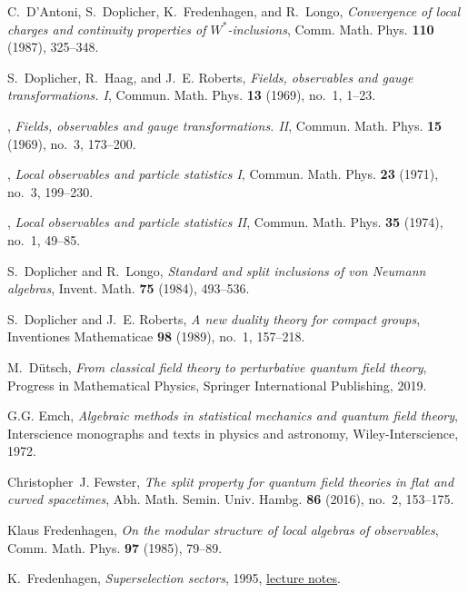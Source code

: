 \documentclass[12pt]{article}
\newcommand{\1}{\mathds{1}}                         %
\begin{document}
{\begin{thebibliography}{BDFY15}
	C.~D'Antoni, S.~Doplicher, K.~Fredenhagen, and R.~Longo, \emph{Convergence of
		local charges and continuity properties of {$W^*$}-inclusions}, Comm. Math.
	Phys. \textbf{110} (1987), 325--348. 
	
	S.~Doplicher, R.~Haag, and J.~E. Roberts, \emph{Fields, observables and gauge
		transformations. {I}}, Commun. Math. Phys. \textbf{13} (1969), no.~1, 1--23.
	
	\bysame, \emph{Fields, observables and gauge transformations. {II}}, Commun.
	Math. Phys. \textbf{15} (1969), no.~3, 173--200.
	
	\bysame, \emph{Local observables and particle statistics {I}}, Commun. Math.
	Phys. \textbf{23} (1971), no.~3, 199--230.
	
	\bysame, \emph{Local observables and particle statistics {II}}, Commun. Math.
	Phys. \textbf{35} (1974), no.~1, 49--85.
	
	S.~Doplicher and R.~Longo, \emph{Standard and split inclusions of von {N}eumann
		algebras}, Invent. Math. \textbf{75} (1984), 493--536. 
	
	S.~Doplicher and J.~E. Roberts, \emph{A new duality theory for compact groups},
	Inventiones Mathematicae \textbf{98} (1989), no.~1, 157--218.
	
	M.~D{\"u}tsch, \emph{From classical field theory to perturbative quantum field
		theory}, Progress in Mathematical Physics, Springer International Publishing,
	2019.
	
	G.G. Emch, \emph{Algebraic methods in statistical mechanics and quantum field
		theory}, Interscience monographs and texts in physics and astronomy,
	Wiley-Interscience, 1972.
	
	Christopher~J. Fewster, \emph{The split property for quantum field theories in
		flat and curved spacetimes}, Abh. Math. Semin. Univ. Hambg. \textbf{86}
	(2016), no.~2, 153--175. 
	
	Klaus Fredenhagen, \emph{On the modular structure of local algebras of
		observables}, Comm. Math. Phys. \textbf{97} (1985), 79--89. 
	
	K.~Fredenhagen, \emph{Superselection sectors}, 1995,
	\href{https://unith.desy.de/sites/sites_custom/site_unith/content/e28509/e45341/e47501/e52578/Superselection.pdf}{lecture
		notes}.
	

\end{thebibliography}}
\end{document}
